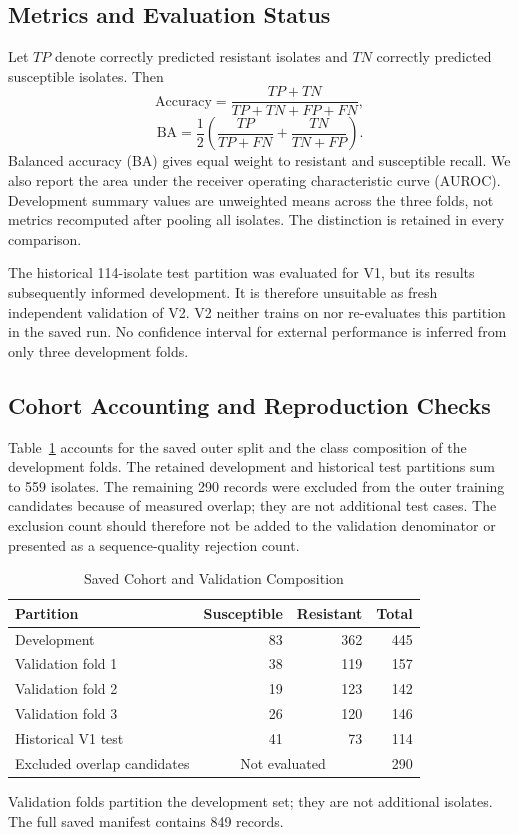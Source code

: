 \documentclass[conference]{IEEEtran}
\begin{document}
\subsection{Metrics and Evaluation Status}
Let $TP$ denote correctly predicted resistant isolates and $TN$ correctly predicted susceptible isolates. Then
\begin{equation}
\mathrm{Accuracy}=\frac{TP+TN}{TP+TN+FP+FN},
\end{equation}
\begin{equation}
\mathrm{BA}=\frac{1}{2}\left(\frac{TP}{TP+FN}+\frac{TN}{TN+FP}\right).
\end{equation}
Balanced accuracy (BA) gives equal weight to resistant and susceptible recall. We also report the area under the receiver operating characteristic curve (AUROC). Development summary values are unweighted means across the three folds, not metrics recomputed after pooling all isolates. The distinction is retained in every comparison.

The historical 114-isolate test partition was evaluated for V1, but its results subsequently informed development. It is therefore unsuitable as fresh independent validation of V2. V2 neither trains on nor re-evaluates this partition in the saved run. No confidence interval for external performance is inferred from only three development folds.

\subsection{Cohort Accounting and Reproduction Checks}
Table~\ref{tab:cohort} accounts for the saved outer split and the class composition of the development folds. The retained development and historical test partitions sum to 559 isolates. The remaining 290 records were excluded from the outer training candidates because of measured overlap; they are not additional test cases. The exclusion count should therefore not be added to the validation denominator or presented as a sequence-quality rejection count.

\begin{table}[t]
\caption{Saved Cohort and Validation Composition}
\label{tab:cohort}
\centering\footnotesize
\begin{tabular}{lrrr}\toprule
Partition & Susceptible & Resistant & Total\\\midrule
Development &83&362&445\\
\quad Validation fold 1&38&119&157\\
\quad Validation fold 2&19&123&142\\
\quad Validation fold 3&26&120&146\\
Historical V1 test&41&73&114\\
Excluded overlap candidates&\multicolumn{2}{c}{Not evaluated}&290\\\bottomrule
\end{tabular}
\vspace{3pt}
\parbox{\columnwidth}{\footnotesize Validation folds partition the development set; they are not additional isolates. The full saved manifest contains 849 records.}
\end{table}
\end{document}
